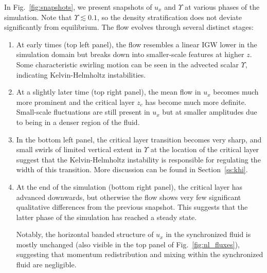 \documentclass[
        fleqn,
        usenatbib,
    ]{mnras}
\begin{document}
In Fig.~\ref{fig:snapshots}, we present snapshots of $u_x$ and $\Upsilon$ at
various phases of the simulation. \textcolor{Corr}{Note that $\Upsilon \lesssim
0.1$, so the density stratification does not deviate significantly from
equilibrium.} The flow evolves through several distinct stages:
\begin{enumerate}
    \item At early times (top left panel), the flow resembles a linear IGW lower
        in the simulation domain but breaks down into smaller-scale features at
        higher $z$. Some characteristic swirling motion can be seen in the
        advected scalar $\Upsilon$, indicating Kelvin-Helmholtz instabilities.

    \item At a slightly later time (top right panel), the mean flow in
        $u_x$ becomes much more prominent and the critical layer $z_c$ has
        become much more definite. Small-scale fluctuations are still present in
        $u_x$ but at smaller amplitudes due to being in a denser region of the
        fluid.

    \item In the bottom left panel, the critical layer transition becomes very
        sharp, and small swirls of limited vertical extent in $\Upsilon$ at the
        location of the critical layer suggest that the Kelvin-Helmholtz
        instability is responsible for regulating the width of this transition.
        More discussion can be found in Section~\ref{ss:khi}.

    \item At the end of the simulation (bottom right panel), the
        \textcolor{Corr}{critical layer has advanced downwards, but otherwise}
        the flow shows very few significant qualitative differences from the
        previous snapshot. This suggests that the latter phase of the simulation
        has reached a steady state.

        \textcolor{Corr}{Notably, the horizontal banded structure of $u_x$ in
        the synchronized fluid is mostly unchanged (also visible in the top
        panel of Fig.~\ref{fig:nl_fluxes}), suggesting that momentum
        redistribution and mixing within the synchronized fluid are negligible.}
\end{enumerate}
\end{document}

